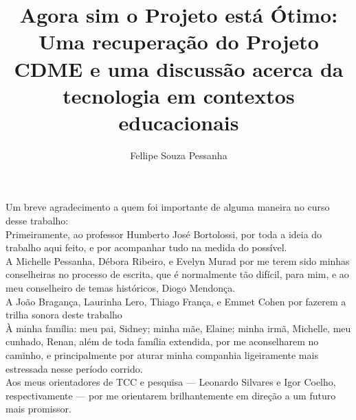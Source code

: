 \documentclass[12pt,openright,twoside,a4paper,brazil]{abntex2}
\title{Agora sim o Projeto está Ótimo: Uma recuperação do Projeto CDME e uma discussão acerca da tecnologia em contextos educacionais}
\author{Fellipe Souza Pessanha}
\begin{document}
\pretextual

\imprimircapa

\imprimirfolhaderosto


\imprimirfolhadeaprovacao

\begin{agradecimentos}

    Um breve agradecimento a quem foi importante de alguma maneira no curso desse trabalho:
    \\
    
    Primeiramente, ao professor Humberto José Bortolossi, por toda a ideia do trabalho aqui feito, e por acompanhar tudo na medida do possível.
    \\
    
    A Michelle Pessanha, Débora Ribeiro, e Evelyn Murad por me terem sido minhas conselheiras no processo de escrita, que é normalmente tão difícil, para mim, e ao meu conselheiro de temas históricos, Diogo Mendonça.
    \\
    
    A João Bragança, Laurinha Lero, Thiago França, e Emmet Cohen por fazerem a trilha sonora deste trabalho
    \\
    
    À minha família: meu pai, Sidney; minha mãe, Elaine; minha irmã, Michelle, meu cunhado, Renan, além de toda família extendida, por me aconselharem no caminho, e principalmente por aturar minha companhia ligeiramente mais estressada nesse período corrido.
    \\
    
    Aos meus orientadores de TCC e pesquisa --- Leonardo Silvares e Igor Coelho, respectivamente --- por me orientarem brilhantemente em direção a um futuro mais promissor.
    
    

\end{agradecimentos}
\end{document}
